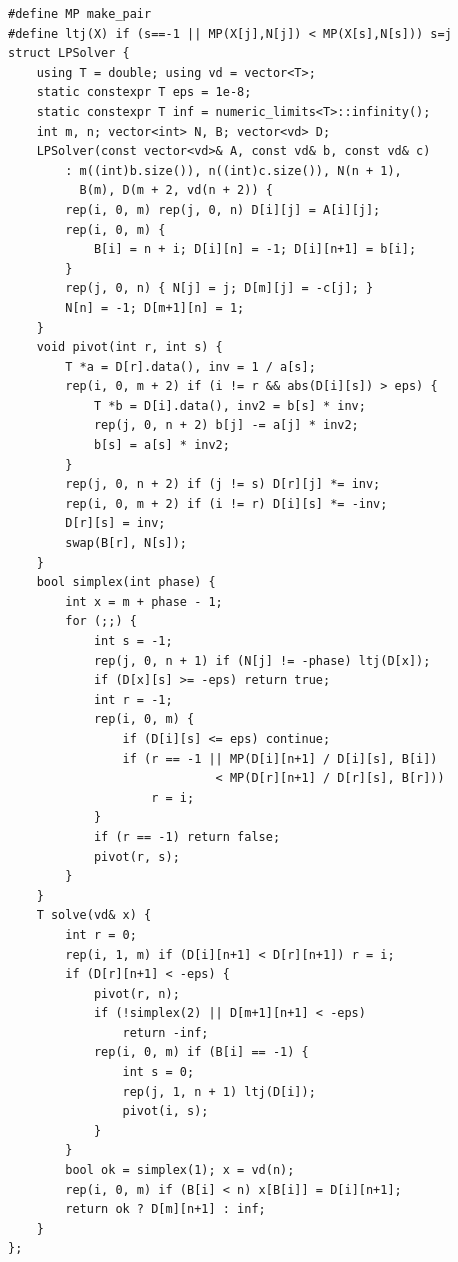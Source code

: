 \begin{lstlisting}
#define MP make_pair
#define ltj(X) if (s==-1 || MP(X[j],N[j]) < MP(X[s],N[s])) s=j
struct LPSolver {
    using T = double; using vd = vector<T>;
    static constexpr T eps = 1e-8;
    static constexpr T inf = numeric_limits<T>::infinity();
    int m, n; vector<int> N, B; vector<vd> D;
    LPSolver(const vector<vd>& A, const vd& b, const vd& c)
        : m((int)b.size()), n((int)c.size()), N(n + 1),
          B(m), D(m + 2, vd(n + 2)) {
        rep(i, 0, m) rep(j, 0, n) D[i][j] = A[i][j];
        rep(i, 0, m) {
            B[i] = n + i; D[i][n] = -1; D[i][n+1] = b[i];
        }
        rep(j, 0, n) { N[j] = j; D[m][j] = -c[j]; }
        N[n] = -1; D[m+1][n] = 1;
    }
    void pivot(int r, int s) {
        T *a = D[r].data(), inv = 1 / a[s];
        rep(i, 0, m + 2) if (i != r && abs(D[i][s]) > eps) {
            T *b = D[i].data(), inv2 = b[s] * inv;
            rep(j, 0, n + 2) b[j] -= a[j] * inv2;
            b[s] = a[s] * inv2;
        }
        rep(j, 0, n + 2) if (j != s) D[r][j] *= inv;
        rep(i, 0, m + 2) if (i != r) D[i][s] *= -inv;
        D[r][s] = inv;
        swap(B[r], N[s]);
    }
    bool simplex(int phase) {
        int x = m + phase - 1;
        for (;;) {
            int s = -1;
            rep(j, 0, n + 1) if (N[j] != -phase) ltj(D[x]);
            if (D[x][s] >= -eps) return true;
            int r = -1;
            rep(i, 0, m) {
                if (D[i][s] <= eps) continue;
                if (r == -1 || MP(D[i][n+1] / D[i][s], B[i])
                             < MP(D[r][n+1] / D[r][s], B[r]))
                    r = i;
            }
            if (r == -1) return false;
            pivot(r, s);
        }
    }
    T solve(vd& x) {
        int r = 0;
        rep(i, 1, m) if (D[i][n+1] < D[r][n+1]) r = i;
        if (D[r][n+1] < -eps) {
            pivot(r, n);
            if (!simplex(2) || D[m+1][n+1] < -eps)
                return -inf;
            rep(i, 0, m) if (B[i] == -1) {
                int s = 0;
                rep(j, 1, n + 1) ltj(D[i]);
                pivot(i, s);
            }
        }
        bool ok = simplex(1); x = vd(n);
        rep(i, 0, m) if (B[i] < n) x[B[i]] = D[i][n+1];
        return ok ? D[m][n+1] : inf;
    }
};
\end{lstlisting}


